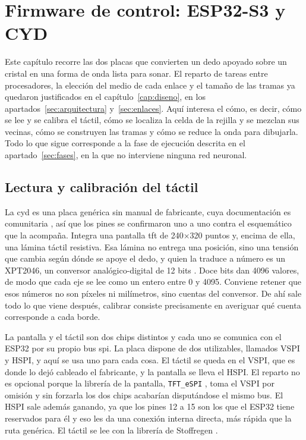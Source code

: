 \chapter{Firmware de control: ESP32-S3 y CYD}
\label{cap:firmware-control}

Este capítulo recorre las dos placas que convierten un dedo apoyado sobre un
cristal en una forma de onda lista para sonar. El reparto de tareas entre
procesadores, la elección del medio de cada enlace y el tamaño de las tramas ya
quedaron justificados en el capítulo~\ref{cap:diseno}, en los
apartados~\ref{sec:arquitectura} y~\ref{sec:enlaces}. Aquí interesa el cómo, es
decir, cómo se lee y se calibra el táctil, cómo se localiza la celda de la
rejilla y se mezclan sus vecinas, cómo se construyen las tramas y cómo se reduce
la onda para dibujarla. Todo lo que sigue corresponde a la fase de ejecución
descrita en el apartado~\ref{sec:fases}, en la que no interviene ninguna red
neuronal.

\section{Lectura y calibración del táctil}
\label{sec:tactil}

La \gls{cyd} es una placa genérica sin manual de fabricante, cuya documentación
es comunitaria \cite{CYDrepo}, así que los pines se confirmaron uno a uno contra 
el esquemático que la acompaña. Integra una pantalla \gls{tft} de 240$\times$320 
puntos y, encima de ella, una lámina táctil resistiva. Esa lámina no entrega una 
posición, sino una tensión que cambia según dónde se apoye el dedo, y quien la traduce
a número es un XPT2046, un conversor analógico-digital de 12 bits \cite{XPT2046}. 
Doce bits dan 4096 valores, de modo que cada eje se lee como un entero entre 0 y 
4095. Conviene retener que esos números no son píxeles ni milímetros, sino cuentas 
del conversor. De ahí sale todo lo que viene después, calibrar consiste 
precisamente en averiguar qué cuenta corresponde a cada borde.

La pantalla y el táctil son dos chips distintos y cada uno se comunica con el ESP32 por 
su propio bus \gls{spi}. La placa dispone de dos utilizables, llamados VSPI y HSPI, y aquí se 
usa uno para cada cosa. El táctil se queda en el VSPI, que es donde lo dejó cableado 
el fabricante, y la pantalla se lleva el HSPI. El reparto no es opcional porque la 
librería de la pantalla, \texttt{TFT\_eSPI} \cite{TFTeSPI}, toma el VSPI por omisión 
y sin forzarla los dos chips acabarían disputándose el mismo bus. El HSPI sale además 
ganando, ya que los pines 12 a 15 son los que el ESP32 tiene reservados para él 
\cite{EspressifESP32} y eso les da una conexión interna directa, más rápida que la ruta 
genérica. El táctil se lee con la librería de Stoffregen \cite{XPT2046Touchscreen}.

